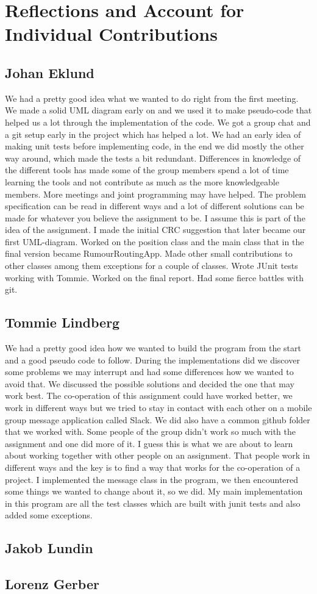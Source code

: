 \documentclass[a4paper,11pt,twoside]{article}
\begin{document}
\section{Reflections and Account for Individual Contributions}
\subsection{Johan Eklund}
We had a pretty good idea what we wanted to do right from the first
meeting. We made a solid UML diagram early on and we used it to make
pseudo-code that helped us a lot through the implementation of the
code.
We got a group chat and a git setup early in the project which has
helped a lot.
We had an early idea of making unit tests before implementing code, in
the end we did mostly the other way around, which made the tests a bit
redundant.
Differences in knowledge of the different tools has made some of the
group members spend a lot of time learning the tools and not
contribute as much as the more knowledgeable members. More meetings
and joint programming may have helped.
The problem specification can be read in different ways and a lot of
different solutions can be made for whatever you believe the
assignment to be. I assume this is part of the idea of the assignment.
I made the initial CRC suggestion that later became our first
UML-diagram. Worked on the position class and the main class that in
the final version became RumourRoutingApp. Made other small
contributions to other classes among them exceptions for a couple of
classes. Wrote JUnit tests working with Tommie. Worked on the final
report. Had some fierce battles with git.

\subsection{Tommie Lindberg}
We had a pretty good idea how we wanted to build the program from the
start and a good pseudo code to follow. During the implementations did
we discover some problems we may interrupt and had some differences how
we wanted to avoid that. We discussed the possible solutions and
decided the one that may work best. 
The co-operation of this assignment could have worked better, we work
in different ways but we tried to stay in contact with each other on a
mobile group message application called Slack. We did also have a
common github folder that we worked with. Some people of the group
didn't work so much with the assignment and one did more of it. I
guess this is what we are about to learn about working together with
other people on an assignment. That people work in different ways and
the key is to find a way that works for the co-operation of a project.
I implemented the message class in the program, we then encountered
some things we wanted to change about it, so we did. My main
implementation in this program are all the test classes which are
built with junit tests and also added some exceptions.

\subsection{Jakob Lundin}

\subsection{Lorenz Gerber}


\end{document}
